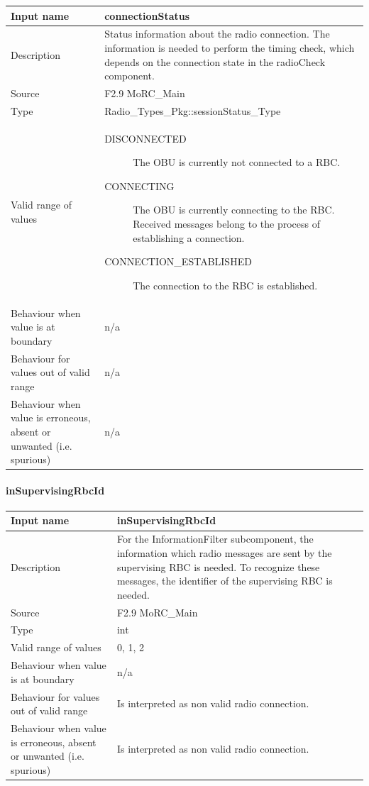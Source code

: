 \begin{longtable}{p{}p{}}
\toprule
Input name				& connectionStatus \\
\midrule
Description				& Status information about the radio connection. The information is needed to perform the timing check, which depends on the connection state in the radioCheck component. \\
\midrule
Source					& F2.9 MoRC\_Main \\ 
\midrule
Type					& Radio\_Types\_Pkg::sessionStatus\_Type \\
\midrule
Valid range of values	& 
\begin{description}
\item[DISCONNECTED] The OBU is currently not connected to a RBC.
\item[CONNECTING] The OBU is currently connecting to the RBC. Received messages belong to the process of establishing a connection.
\item[CONNECTION\_ESTABLISHED] The connection to the RBC is established.
\end{description} \\
\midrule
Behaviour when value is at boundary	& n/a\\
\midrule
Behaviour for values out of valid range	& n/a\\
\midrule
Behaviour when value is erroneous, absent or unwanted (i.e. spurious) & n/a\\
\bottomrule
\end{longtable}


\paragraph{inSupervisingRbcId}

\begin{longtable}{p{}p{}}
\toprule
Input name				& inSupervisingRbcId \\
\midrule
Description				& For the InformationFilter subcomponent, the information which radio messages are sent by the supervising RBC is needed. To recognize these messages, the identifier of the supervising RBC is needed. \\
\midrule
Source					& F2.9 MoRC\_Main\\ 
\midrule
Type					& int \\
\midrule
Valid range of values	& 0, 1, 2
 \\
\midrule
Behaviour when value is at boundary	& n/a\\
\midrule
Behaviour for values out of valid range	&  Is interpreted as non valid radio connection.\\
\midrule
Behaviour when value is erroneous, absent or unwanted (i.e. spurious) & Is interpreted as non valid radio connection.\\
\bottomrule
\end{longtable}


